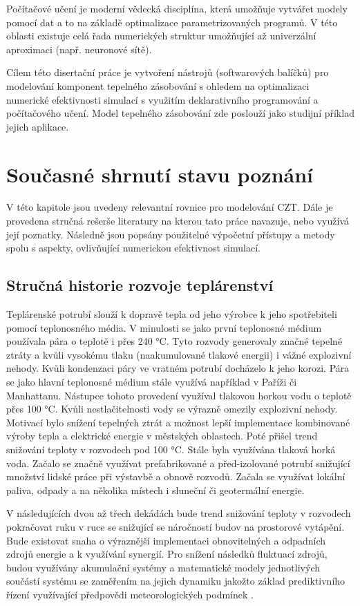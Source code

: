Počítačové učení je moderní vědecká disciplína, která umožňuje vytvářet modely
pomocí dat a to na základě optimalizace parametrizovaných programů. V této
oblasti existuje celá řada numerických struktur umožňující až univerzální
aproximaci (např. neuronové sítě).

Cílem této disertační práce je vytvoření nástrojů (softwarových balíčků) pro
modelování komponent tepelného zásobování s ohledem na optimalizaci numerické
efektivnosti simulací s využitím deklarativního programování a počítačového
učení. Model tepelného zásobování zde poslouží jako studijní příklad jejich
aplikace.

\chapter{Současné shrnutí stavu poznání}
\label{struktura}
V této kapitole jsou uvedeny relevantní rovnice pro modelování CZT. Dále je
provedena stručná rešerše literatury na kterou tato práce navazuje, nebo
využívá její poznatky. Následně jsou popsány použitelné výpočetní přístupy
a metody spolu s aspekty, ovlivňující numerickou efektivnost simulací.

\section{Stručná historie rozvoje teplárenství}
\label{sec:history}
Teplárenské potrubí slouží k dopravě tepla od jeho výrobce k jeho spotřebiteli
pomocí teplonosného média. V minulosti se jako první teplonosné médium
používala pára o teplotě i přes 240 °C. Tyto rozvody generovaly značné tepelné
ztráty a kvůli vysokému tlaku (naakumulované tlakové energii) i vážné
explozivní nehody. Kvůli kondenzaci páry ve vratném potrubí docházelo k jeho
korozi. Pára se jako hlavní teplonosné médium stále využívá například v Paříži
či Manhattanu. Nástupce tohoto provedení využíval tlakovou horkou vodu o
teplotě přes 100 °C. Kvůli nestlačitelnosti vody se výrazně omezily explozivní
nehody.
Motivací bylo snížení tepelných ztrát a možnost lepší implementace kombinované
výroby tepla a elektrické energie v městských oblastech. Poté přišel trend
snižování teploty v rozvodech pod 100 °C. Stále byla využívána tlaková horká
voda. Začalo se značně využívat prefabrikované a před-izolované potrubí
snižující množství lidské práce při výstavbě a obnově rozvodů. Začala se
využívat lokální paliva, odpady a na několika místech i sluneční či geotermální
energie.

V následujících dvou až třech dekádách bude trend snižování teploty v
rozvodech pokračovat ruku v ruce se snižující se náročností budov na prostorové
vytápění. Bude existovat snaha o výraznější implementaci obnovitelných a
odpadních zdrojů energie a k využívání synergií. Pro snížení následků fluktuací
zdrojů, budou využívány akumulační systémy a matematické modely jednotlivých
součástí systému se zaměřením na jejich dynamiku jakožto základ prediktivního
řízení využívající předpovědi meteorologických podmínek \cite{Lund2014}.


